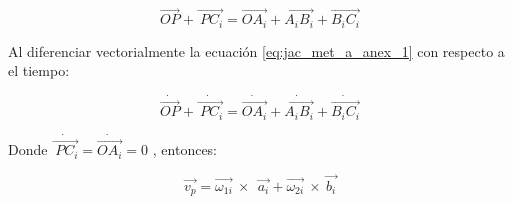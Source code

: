             \begin{equation}
                 \overrightarrow{OP}+\overrightarrow{~PC_{i}} =\overrightarrow{OA_{i}}+\overrightarrow{A_{i}B_{i}}+\overrightarrow{B_{i}C_{i}}
            \label{eq:jac_met_a_anex_1}
            \end{equation}
            
            Al diferenciar vectorialmente la ecuación \ref{eq:jac_met_a_anex_1} con respecto a el tiempo:
            
            \begin{equation*}
                 \dot{\overrightarrow{OP}}+\dot{\overrightarrow{~PC_{i}}}= \dot{\overrightarrow{OA_{i}}}+ \dot{\overrightarrow{A_{i}B_{i}}}+ \dot{\overrightarrow{B_{i}C_{i}}} 
            \end{equation*}
            
            Donde  $\dot{\overrightarrow{~PC_{i}}}= \dot{\overrightarrow{OA_{i}}}=0$ , entonces:
            
            \begin{equation}
                 \overrightarrow{v_{p}}= \overrightarrow{ \omega _{1i}}~\times~~\overrightarrow{a_{i}}+  \overrightarrow{ \omega _{2i}}~\times~\overrightarrow{b_{i}}
            \label{eq:jac_met_a_anex_2}
            \end{equation}
            
